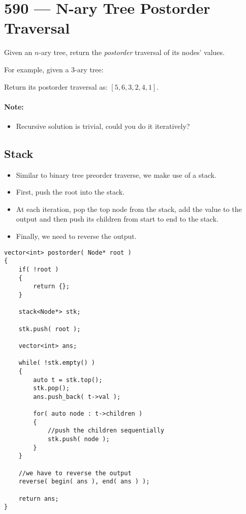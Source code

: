 \section{590 --- N-ary Tree Postorder Traversal}
Given an $n$-ary tree, return the \textit{postorder} traversal of its nodes' values.

For example, given a 3-ary tree:

\begin{figure}[H]
\end{figure}

Return its postorder traversal as: $[5,6,3,2,4,1]$.


\paragraph{Note:}

\begin{itemize}
\item Recursive solution is trivial, could you do it iteratively?
\end{itemize}

\subsection{Stack}
\begin{itemize}
\item Similar to binary tree preorder traverse, we make use of a stack.
\item First, push the root into the stack.
\item At each iteration, pop the top node from the stack, add the value to the output and then push its children from start to end to the stack. 
\item Finally, we need to reverse the output.
\end{itemize}

\setcounter{lstlisting}{0}
\begin{lstlisting}[style=customc, caption={Stack}]
vector<int> postorder( Node* root )
{
    if( !root )
    {
        return {};
    }

    stack<Node*> stk;

    stk.push( root );

    vector<int> ans;

    while( !stk.empty() )
    {
        auto t = stk.top();
        stk.pop();
        ans.push_back( t->val );

        for( auto node : t->children )
        {
            //push the children sequentially
            stk.push( node );
        }
    }

    //we have to reverse the output
    reverse( begin( ans ), end( ans ) );

    return ans;
}
\end{lstlisting}